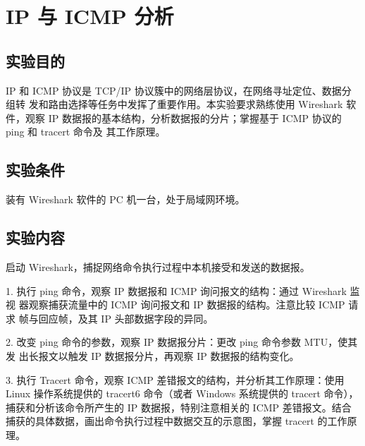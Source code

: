 \documentclass[a4paper,12pt]{report}
\begin{document}
\chapter*{IP 与 ICMP 分析
}
\setcounter{page}{1}
\begin{spacing}{1.5}
\songti{}

\section{实验目的}
IP 和 ICMP 协议是 TCP/IP 协议簇中的网络层协议，在网络寻址定位、数据分组转 发和路由选择等任务中发挥了重要作用。本实验要求熟练使用 Wireshark 软件，观察 IP 数据报的基本结构，分析数据报的分片；掌握基于 ICMP 协议的 ping 和 tracert 命令及 其工作原理。

\section{实验条件}
装有 Wireshark 软件的 PC 机一台，处于局域网环境。

\section{实验内容}
启动 Wireshark，捕捉网络命令执行过程中本机接受和发送的数据报。

1. 执行 ping 命令，观察 IP 数据报和 ICMP 询问报文的结构：通过 Wireshark 监视 器观察捕获流量中的 ICMP 询问报文和 IP 数据报的结构。注意比较 ICMP 请求 帧与回应帧，及其 IP 头部数据字段的异同。

2. 改变 ping 命令的参数，观察 IP 数据报分片：更改 ping 命令参数 MTU，使其发 出长报文以触发 IP 数据报分片，再观察 IP 数据报的结构变化。

3. 执行 Tracert 命令，观察 ICMP 差错报文的结构，并分析其工作原理：使用 Linux 操作系统提供的 tracert6 命令（或者 Windows 系统提供的 tracert 命令）， 捕获和分析该命令所产生的 IP 数据报，特别注意相关的 ICMP 差错报文。结合 捕获的具体数据，画出命令执行过程中数据交互的示意图，掌握 tracert 的工作原理。


\end{spacing}
\end{document}
